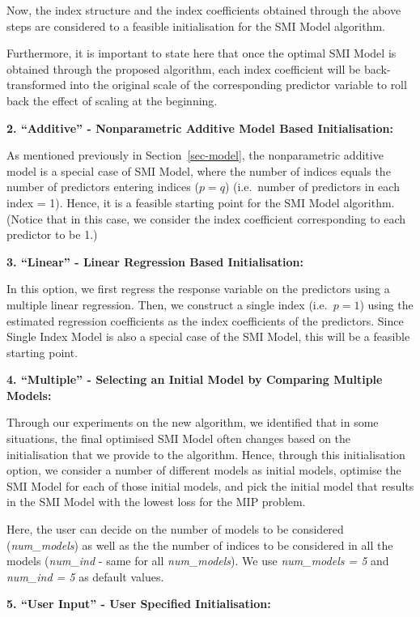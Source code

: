 \documentclass[11pt,a4paper,]{article}
\begin{document}
Now, the index structure and the index coefficients obtained through the
above steps are considered to a feasible initialisation for the SMI
Model algorithm.

Furthermore, it is important to state here that once the optimal SMI
Model is obtained through the proposed algorithm, each index coefficient
will be back-transformed into the original scale of the corresponding
predictor variable to roll back the effect of scaling at the beginning.

\textbf{2. ``Additive'' - Nonparametric Additive Model Based
Initialisation:}

As mentioned previously in Section~\ref{sec-model}, the nonparametric
additive model is a special case of SMI Model, where the number of
indices equals the number of predictors entering indices (\(p = q\))
(i.e.~number of predictors in each index = 1). Hence, it is a feasible
starting point for the SMI Model algorithm. (Notice that in this case,
we consider the index coefficient corresponding to each predictor to be
1.)

\textbf{3. ``Linear'' - Linear Regression Based Initialisation:}

In this option, we first regress the response variable on the predictors
using a multiple linear regression. Then, we construct a single index
(i.e.~\(p = 1\)) using the estimated regression coefficients as the
index coefficients of the predictors. Since Single Index Model is also a
special case of the SMI Model, this will be a feasible starting point.

\textbf{4. ``Multiple'' - Selecting an Initial Model by Comparing
Multiple Models:}

Through our experiments on the new algorithm, we identified that in some
situations, the final optimised SMI Model often changes based on the
initialisation that we provide to the algorithm. Hence, through this
initialisation option, we consider a number of different models as
initial models, optimise the SMI Model for each of those initial models,
and pick the initial model that results in the SMI Model with the lowest
loss for the MIP problem.

Here, the user can decide on the number of models to be considered
(\emph{num\_models}) as well as the the number of indices to be
considered in all the models (\emph{num\_ind} - same for all
\emph{num\_models}). We use \emph{num\_models = 5} and \emph{num\_ind =
5} as default values.

\textbf{5. ``User Input'' - User Specified Initialisation:}
\end{document}

